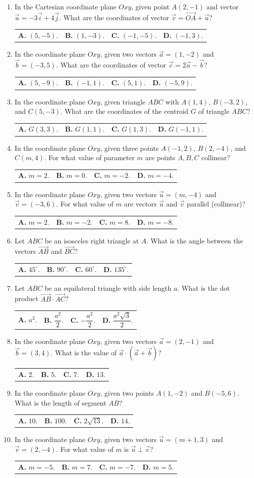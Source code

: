 \documentclass[10pt,a4paper]{article}
\makeatletter
\newcommand{\four}[4]{\par\noindent\begin{tabularx}{\linewidth}{@{}*{4}{>{\raggedright\arraybackslash}X}@{}}\textbf{A.} #1&\textbf{B.} #2&\textbf{C.} #3&\textbf{D.} #4\end{tabularx}}
\makeatother
\begin{document}
\begin{enumerate}
\item In the Cartesian coordinate plane $Oxy$, given point $A(2, -1)$ and vector $\vec{u} = -3\vec{i} + 4\vec{j}$. What are the coordinates of vector $\vec{v} = \vec{OA} + \vec{u}$?
\four{$(5, -5)$.}{$(1, -3)$.}{$(-1, -5)$.}{$(-1, 3)$.}

\item In the coordinate plane $Oxy$, given two vectors $\vec{a} = (1, -2)$ and $\vec{b} = (-3, 5)$. What are the coordinates of vector $\vec{c} = 2\vec{a} - \vec{b}$?
\four{$(5, -9)$.}{$(-1, 1)$.}{$(5, 1)$.}{$(-5, 9)$.}

\item In the coordinate plane $Oxy$, given triangle $ABC$ with $A(1, 4)$, $B(-3, 2)$, and $C(5, -3)$. What are the coordinates of the centroid $G$ of triangle $ABC$?
\four{$G(3, 3)$.}{$G(1, 1)$.}{$G(1, 3)$.}{$G(-1, 1)$.}

\item In the coordinate plane $Oxy$, given three points $A(-1, 2)$, $B(2, -4)$, and $C(m, 4)$. For what value of parameter $m$ are points $A, B, C$ collinear?
\four{$m = 2$.}{$m = 0$.}{$m = -2$.}{$m = -4$.}
\pagebreak

\item In the coordinate plane $Oxy$, given two vectors $\vec{u} = (m, -4)$ and $\vec{v} = (-3, 6)$. For what value of $m$ are vectors $\vec{u}$ and $\vec{v}$ parallel (collinear)?
\four{$m = 2$.}{$m = -2$.}{$m = 8$.}{$m = -8$.}

\item Let $ABC$ be an isosceles right triangle at $A$. What is the angle between the vectors $\vec{AB}$ and $\vec{BC}$?
\four{$45^\circ$.}{$90^\circ$.}{$60^\circ$.}{$135^\circ$.}

\item Let $ABC$ be an equilateral triangle with side length $a$. What is the dot product $\vec{AB} \cdot \vec{AC}$?
\four{$a^2$.}{$\dfrac{a^2}{2}$.}{$-\dfrac{a^2}{2}$.}{$\dfrac{a^2\sqrt{3}}{2}$.}

\item In the coordinate plane $Oxy$, given two vectors $\vec{a} = (2, -1)$ and $\vec{b} = (3, 4)$. What is the value of $\vec{a} \cdot (\vec{a} + \vec{b})$?
\four{$2$.}{$5$.}{$7$.}{$13$.}

\item In the coordinate plane $Oxy$, given two points $A(1, -2)$ and $B(-5, 6)$. What is the length of segment $AB$?
\four{$10$.}{$100$.}{$2\sqrt{13}$.}{$14$.}

\item In the coordinate plane $Oxy$, given two vectors $\vec{u} = (m + 1, 3)$ and $\vec{v} = (2, -4)$. For what value of $m$ is $\vec{u} \perp \vec{v}$?
\four{$m = -5$.}{$m = 7$.}{$m = -7$.}{$m = 5$.}


\end{enumerate}
\end{document}
